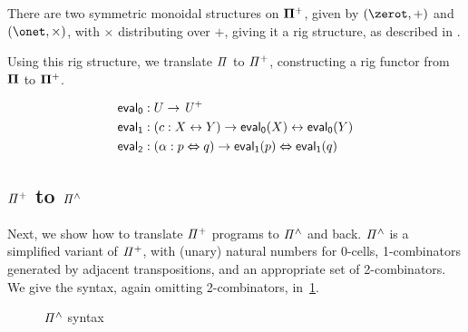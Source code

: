 \begin{proposition}
  There are two symmetric monoidal structures on $\mathbf{\Pi^{+}}$, given by $(\zerot, +)$ and $(\onet, \times)$, with
  $\times$ distributing over $+$, giving it a rig structure, as described in .
\end{proposition}

Using this rig structure, we translate $\mathit{\Pi}$ to $\mathit{{\Pi}^{+}}$, constructing a rig functor from $\mathbf{\Pi}$ to
$\mathbf{\Pi^{+}}$.

\begin{definition}
  \begin{align*}
    \evalt_{0} & : U \to \UPlus                                             \\
    \evalt_{1} & : (c : X \iso Y) \to \evalt_{0}(X) \iso \evalt_{0}(Y)      \\
    \evalt_{2} & : (\alpha : p \Iso q) \to \evalt_{1}(p) \Iso \evalt_{1}(q)
  \end{align*}
\end{definition}

\subsection{$\mathit{{\Pi}^{+}}$ to $\mathit{{\Pi}^{\wedge}}$}

Next, we show how to translate $\mathit{{\Pi}^{+}}$ programs to $\mathit{{\Pi}^{\wedge}}$ and back. $\mathit{{\Pi}^{\wedge}}$ is a simplified variant of
$\mathit{{\Pi}^{+}}$, with (unary) natural numbers for 0-cells, 1-combinators generated by adjacent transpositions, and an
appropriate set of 2-combinators. We give the syntax, again omitting 2-combinators, in~\cref{fig:pihat}.

\begin{figure}[t]
  {}

  {}
  \caption{$\mathit{{\Pi}^{\wedge}}$ syntax}
  \label{fig:pihat}
\end{figure}

